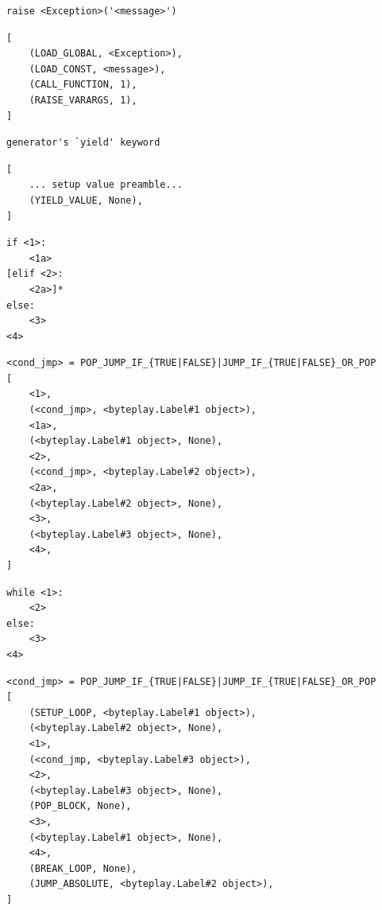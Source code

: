 \documentclass{icldt}
\numberwithin{equation}{section}       %
\begin{document}
{{\newsavebox\twelveleft
\begin{lrbox}{\twelveleft}
\begin{lstlisting}
raise <Exception>('<message>')
\end{lstlisting}
\end{lrbox}
\newsavebox\twelveright
\begin{lrbox}{\twelveright}
\begin{lstlisting}
[
	(LOAD_GLOBAL, <Exception>),
	(LOAD_CONST, <message>),
	(CALL_FUNCTION, 1),
	(RAISE_VARARGS, 1),
]
\end{lstlisting}
\end{lrbox}

\newsavebox\thirteenleft
\begin{lrbox}{\thirteenleft}
\begin{lstlisting}
generator's `yield' keyword
\end{lstlisting}
\end{lrbox}
\newsavebox\thirteenright
\begin{lrbox}{\thirteenright}
\begin{lstlisting}
[
	... setup value preamble...
	(YIELD_VALUE, None),
]
\end{lstlisting}
\end{lrbox}

\newsavebox\ifcondleft
\begin{lrbox}{\ifcondleft}
\begin{lstlisting}
if <1>:
	<1a>
[elif <2>:
	<2a>]*
else:
	<3>
<4>
\end{lstlisting}
\end{lrbox}
\newsavebox\ifcondright
\begin{lrbox}{\ifcondright}
\begin{lstlisting}
<cond_jmp> = POP_JUMP_IF_{TRUE|FALSE}|JUMP_IF_{TRUE|FALSE}_OR_POP
[
	<1>,
	(<cond_jmp>, <byteplay.Label#1 object>),
	<1a>,
	(<byteplay.Label#1 object>, None),
	<2>,
	(<cond_jmp>, <byteplay.Label#2 object>),
	<2a>,
	(<byteplay.Label#2 object>, None),
	<3>,
	(<byteplay.Label#3 object>, None),
	<4>,
]
\end{lstlisting}
\end{lrbox}

\newsavebox\whileleft
\begin{lrbox}{\whileleft}
\begin{lstlisting}
while <1>:
	<2>
else:
	<3>
<4>
\end{lstlisting}
\end{lrbox}
\newsavebox\whileright
\begin{lrbox}{\whileright}
\begin{lstlisting}
<cond_jmp> = POP_JUMP_IF_{TRUE|FALSE}|JUMP_IF_{TRUE|FALSE}_OR_POP
[
	(SETUP_LOOP, <byteplay.Label#1 object>),
	(<byteplay.Label#2 object>, None),
	<1>,
	(<cond_jmp, <byteplay.Label#3 object>),
	<2>,
	(<byteplay.Label#3 object>, None),
	(POP_BLOCK, None),
	<3>,
	(<byteplay.Label#1 object>, None),
	<4>,
	(BREAK_LOOP, None),
	(JUMP_ABSOLUTE, <byteplay.Label#2 object>),
]
\end{lstlisting}
\end{lrbox}

}}
\end{document}
